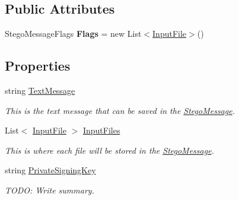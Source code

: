 \subsection*{Public Attributes}
\begin{DoxyCompactItemize}
\item 
Stego\+Message\+Flags {\bfseries Flags} = new List$<$\hyperlink{class_stegosaurus_1_1_input_file}{Input\+File}$>$()\hypertarget{class_stegosaurus_1_1_stego_message_a1ec3adc5e452b5c512b1c0ee3c86e6d8}{}\label{class_stegosaurus_1_1_stego_message_a1ec3adc5e452b5c512b1c0ee3c86e6d8}

\end{DoxyCompactItemize}
\subsection*{Properties}
\begin{DoxyCompactItemize}
\item 
string \hyperlink{class_stegosaurus_1_1_stego_message_ab37f4ee21d0891f86693576a7d2bd389}{Text\+Message}
\begin{DoxyCompactList}\small\item\em This is the text message that can be saved in the \hyperlink{class_stegosaurus_1_1_stego_message}{Stego\+Message}. \end{DoxyCompactList}\item 
List$<$ \hyperlink{class_stegosaurus_1_1_input_file}{Input\+File} $>$ \hyperlink{class_stegosaurus_1_1_stego_message_a284ab72c2bb641cabe1a09de8d46de6a}{Input\+Files}
\begin{DoxyCompactList}\small\item\em This is where each file will be stored in the \hyperlink{class_stegosaurus_1_1_stego_message}{Stego\+Message}. \end{DoxyCompactList}\item 
string \hyperlink{class_stegosaurus_1_1_stego_message_a8fa8e3dce966a2fa578d74267f8d2a15}{Private\+Signing\+Key}
\begin{DoxyCompactList}\small\item\em T\+O\+DO\+: Write summary. \end{DoxyCompactList}\end{DoxyCompactItemize}


